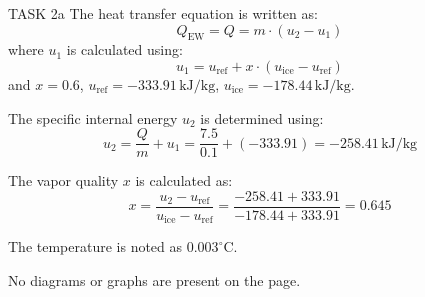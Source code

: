 TASK 2a  
The heat transfer equation is written as:  
\[
Q_{\text{EW}} = Q = m \cdot (u_2 - u_1)
\]  
where \( u_1 \) is calculated using:  
\[
u_1 = u_{\text{ref}} + x \cdot (u_{\text{ice}} - u_{\text{ref}})
\]  
and \( x = 0.6 \), \( u_{\text{ref}} = -333.91 \, \text{kJ/kg} \), \( u_{\text{ice}} = -178.44 \, \text{kJ/kg} \).  

The specific internal energy \( u_2 \) is determined using:  
\[
u_2 = \frac{Q}{m} + u_1 = \frac{7.5}{0.1} + (-333.91) = -258.41 \, \text{kJ/kg}
\]  

The vapor quality \( x \) is calculated as:  
\[
x = \frac{u_2 - u_{\text{ref}}}{u_{\text{ice}} - u_{\text{ref}}} = \frac{-258.41 + 333.91}{-178.44 + 333.91} = 0.645
\]  

The temperature is noted as \( 0.003^\circ\text{C} \).  

No diagrams or graphs are present on the page.